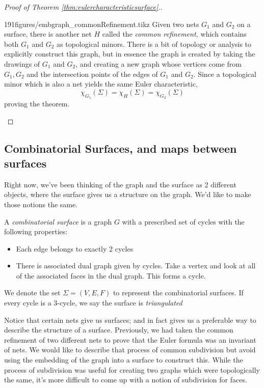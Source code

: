 \begin{proof}[Proof of Theorem \ref{thm:eulercharacteristicsurface}.]
\begin{paragraphfigureenv}{191figures/embgraph_commonRefinement.tikz}
Given two nets $G_1$ and $G_2$ on a surface, there is another net $H$ called the \emph{common refinement,} which contains both $G_1$ and $G_2$ as topological minors. There is a bit of topology or analysis to explicitly construct this graph, but in essence the graph is created by taking the drawings of $G_1$ and $G_2$, and creating a new graph whose vertices come from $G_1, G_2$ and the intersection points of the edges of $G_1$ and $G_2$. 
Since a topological minor which is also a net yields the same Euler characteristic,
\[\chi_{G_1}(\Sigma)=\chi_{H}(\Sigma)=\chi_{G_2}(\Sigma)\]
proving the theorem.
\end{paragraphfigureenv}

\end{proof}
\subsection{Combinatorial Surfaces, and maps between surfaces}
Right now, we've been thinking of the graph and the surface as 2 different objects, where the surface gives us a structure on the graph. We'd like to make those notions the same. 
\begin{definition}
 A \emph{combinatorial surface} is a graph $G$ with a prescribed set of cycles with the following properties: 
 \begin{itemize}
  \item Each edge belongs to exactly 2 cycles
  \item There is associated dual graph given by cycles. Take a vertex and look at all of the associated faces in the dual graph. This forms a cycle. 
 \end{itemize}
 We denote the set $\Sigma=(V, E, F)$ to represent the combinatorial surfaces.  If every cycle is a 3-cycle, we say the surface is \emph{triangulated}
\end{definition}
Notice that certain nets give us surfaces; and in fact gives us a preferable way to describe the structure of a surface. 
Previously, we had taken the common refinement of two different nets to prove that the Euler formula was an invariant of nets. We would like to describe that process of common subdivision but avoid using the embedding of the graph into a surface to construct this. 
While the process of subdivision was useful for creating two graphs which were topologically the same, it's more difficult to come up with a notion of subdivision for faces. 


